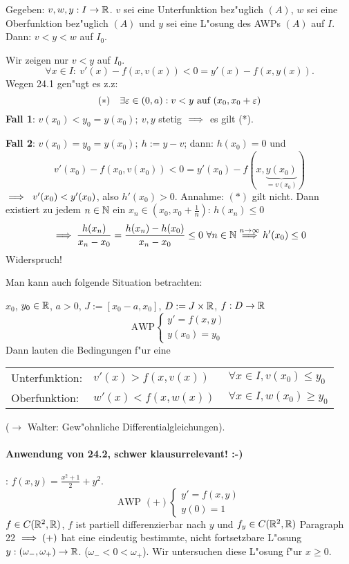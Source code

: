 \documentclass{article}
\begin{document}
\begin{satz}
Gegeben: $v,w,y:I\to\mathbb{R}$. $v$ sei eine Unterfunktion bez"uglich $(A)$, $w$ sei eine Oberfunktion
bez"uglich $(A)$ und $y$ sei eine L"osung des AWPs $(A)$ auf $I$. Dann: $v<y<w$ auf $I_0$.
\end{satz}
\begin{beweis}
Wir zeigen nur $v<y$ auf $I_0$.
\[
	\forall x\in I:\ v'(x)-f(x, v(x))<0=y'(x)-f(x,y(x)).
\]
Wegen 24.1 gen"ugt es z.z:
\[
	(*)\quad \exists\varepsilon\in(0,a): v<y\text{ auf } (x_0, x_0+\varepsilon)
\]
\textbf{Fall 1}: $v(x_0)<y_0=y(x_0);\ v,y$ stetig $\implies$ es gilt (*).

\textbf{Fall 2}: $v(x_0)=y_0=y(x_0);\ h:=y-v$; dann: $h(x_0)=0$ und
\[
	v'(x_0)-f(x_0, v(x_0))<0=y'(x_0)-f(x,\underbrace{y(x_0)}_{=v(x_0)})
\]
$\implies\ v'(x_0)<y'(x_0)$, also $h'(x_0)>0$.
Annahme: $(*)$ gilt nicht. Dann existiert zu jedem $n\in\mathbb{N}$ ein $x_n\in(x_0, x_0+\frac{1}{n})$: $h(x_n)\le 0$
\[
	\implies \frac{h(x_n)}{x_n-x_0}=\frac{h(x_n)-h(x_0)}{x_n-x_0}\le 0\ \forall n\in\mathbb{N}\overset{n\to\infty}{\implies}h'(x_0)\le 0
\]
Widerspruch!
\end{beweis}

\begin{bemerkung}
Man kann auch folgende Situation betrachten:

$x_0$, $y_0\in\mathbb{R}$, $a>0$, $J:=[x_0-a, x_0]$, $D:=J\times\mathbb{R}$, $f:D\to\mathbb{R}$
\[
	\text{AWP}\begin{cases}
		y'=f(x,y)\\
		y(x_0)=y_0
	\end{cases}
\]
Dann lauten die Bedingungen f"ur eine

\begin{tabular}{lll}
Unterfunktion:&$v'(x)>f(x,v(x))$&$\ \forall x\in I, v(x_0)\le y_0$\\
Oberfunktion:&$w'(x)<f(x,w(x))$&$\ \forall x\in I, w(x_0)\ge y_0$
\end{tabular}

($\to$ Walter: Gew"ohnliche Differentialgleichungen).
\end{bemerkung}
\paragraph{Anwendung von 24.2, schwer klausurrelevant! :-)}: $f(x,y) = \frac{x^2+1}{2}+y^2$.
\[
	\text{AWP }(+) \begin{cases}
		y'=f(x,y)\\
		y(0)=1
	\end{cases}
\]
$f\in C(\mathbb{R}^2,\mathbb{R})$, $f$ ist partiell differenzierbar nach $y$ und $f_y\in C(\mathbb{R}^2, \mathbb{R})$
Paragraph 22 $\implies (+)$ hat eine eindeutig bestimmte, nicht fortsetzbare L"osung $y:(\omega_-, \omega_+)\to\mathbb{R}$.
($\omega_-<0<\omega_+$). Wir untersuchen diese L"osung f"ur $x\ge 0$.
\end{document}
